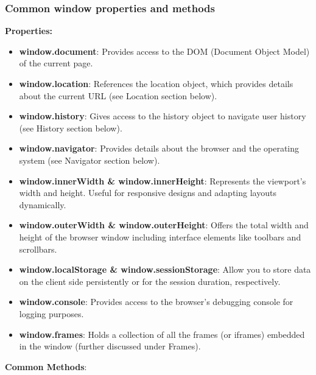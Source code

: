 \documentclass{report}
\begin{document}
    \subsubsection{Common window properties and methods}
    \bigbreak \noindent 
    \textbf{Properties:}
    \begin{itemize}
        \item \textbf{window.document}: Provides access to the DOM (Document Object Model) of the current page.
        \item \textbf{window.location}: References the location object, which provides details about the current URL (see Location section below).
        \item \textbf{window.history}: Gives access to the history object to navigate user history (see History section below).
        \item \textbf{window.navigator}: Provides details about the browser and the operating system (see Navigator section below).
        \item \textbf{window.innerWidth \& window.innerHeight}: Represents the viewport’s width and height. Useful for responsive designs and adapting layouts dynamically.
        \item \textbf{window.outerWidth \& window.outerHeight}: Offers the total width and height of the browser window including interface elements like toolbars and scrollbars.
        \item \textbf{window.localStorage \& window.sessionStorage}: Allow you to store data on the client side persistently or for the session duration, respectively.
        \item \textbf{window.console}: Provides access to the browser’s debugging console for logging purposes.
        \item \textbf{window.frames}: Holds a collection of all the frames (or iframes) embedded in the window (further discussed under Frames).
    \end{itemize}
    \bigbreak \noindent 
    \textbf{Common Methods}:
\end{document}
